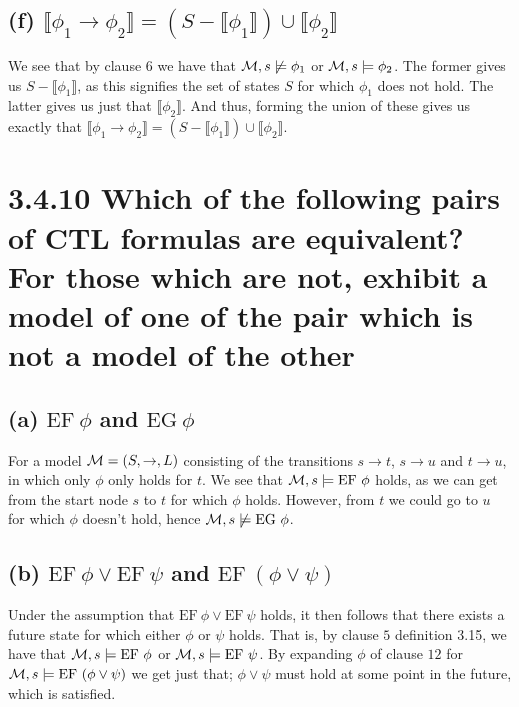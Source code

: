 \documentclass[11pt,a4paper]{article}
\let\imp\to
\begin{document}
\subsection*{(f) \mdseries $\llbracket\phi_1 \imp \phi_2\rrbracket =
(S - \llbracket\phi_1\rrbracket)\cup\llbracket\phi_2\rrbracket$}
We see that by clause $6$ we have that ${\cal M}, s \not\models \phi_1$ or
${\cal M}, s \models \phi_2$. The former gives us $S -
\llbracket\phi_1\rrbracket$, as this signifies the set of states $S$ for
which $\phi_1$ does not hold. The latter gives us just that $\llbracket\phi_2
\rrbracket$. And thus, forming the union of these gives us exactly that
$\llbracket\phi_1 \imp \phi_2\rrbracket =
(S - \llbracket\phi_1\rrbracket)\cup\llbracket\phi_2\rrbracket$.

\newpage
\section*{3.4.10 \mdseries Which of the following pairs of CTL formulas are
equivalent? For those which are not, exhibit a model of one of the pair which
is not a model of the other}

\subsection*{(a) \mdseries $\text{EF}{\ }\phi$ and $\text{EG}{\ }\phi$}
For a model ${\cal M} = (S,\imp,L)$ consisting of the transitions $s \imp t$,
$s \imp u$ and $t \imp u$, in which only $\phi$ only holds for $t$. We see
that ${\cal M}, s \models \text{EF}{\ }\phi$ holds, as we can get from the
start node $s$ to $t$ for which $\phi$ holds. However, from $t$ we could go
to $u$ for which $\phi$ doesn't hold, hence
${\cal M}, s \not\models \text{EG}{\ }\phi$.

\subsection*{(b) \mdseries $\text{EF}{\ }\phi \lor \text{EF}{\ }\psi$ and
$\text{EF}{\ }(\phi \lor \psi)$}
Under the assumption that $\text{EF}{\ }\phi \lor \text{EF}{\ }\psi$ holds, it
then follows that there exists a future state for which either $\phi$ or
$\psi$ holds. That is, by clause $5$ definition 3.15, we have that
${\cal M}, s \models \text{EF}{\ }\phi$ or
${\cal M}, s \models \text{EF}{\ }\psi$. By expanding $\phi$ of clause $12$
for ${\cal M}, s \models \text{EF}{\ }(\phi \lor \psi)$ we get just that;
$\phi \lor \psi$ must hold at some point in the future, which is satisfied.
\end{document}
